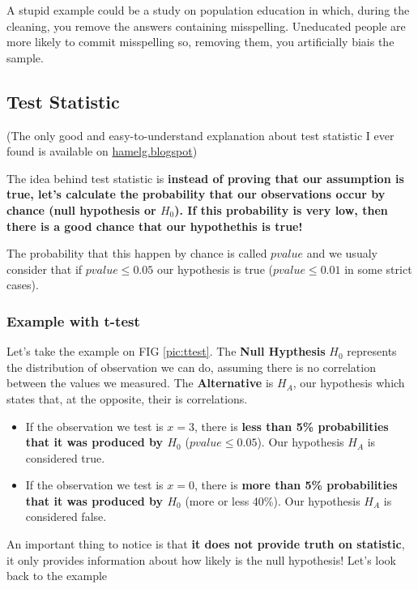 \documentclass[a4paper,11pt,twoside]{article}
\begin{document}
A stupid example could be a study on population education in which, during the cleaning, you remove the answers containing misspelling. Uneducated people are more likely to commit misspelling so, removing them, you artificially biais the sample.

\subsection{Test Statistic}

(The only good and easy-to-understand explanation about test statistic I ever found is available on \href{http://hamelg.blogspot.ch/2015/11/python-for-data-analysis-part-24.html?view=flipcard}{hamelg.blogspot})

The idea behind test statistic is \textbf{instead of proving that our assumption is true, let's calculate the probability that our observations occur by chance (null hypothesis or $H_0$). If this probability is very low, then there is a good chance that our hypothethis is true!}

The probability that this happen by chance is called $pvalue$ and we usualy consider that if $pvalue \leq 0.05$ our hypothesis is true ($pvalue \leq 0.01$ in some strict cases).

\subsubsection{Example with t-test}

Let's take the example on FIG \ref{pic:ttest}. The \textbf{Null Hypthesis} $H_0$ represents the distribution of observation we can do, assuming there is no correlation between the values we measured. The \textbf{Alternative} is $H_A$, our hypothesis which states that, at the opposite, their is correlations.
\begin{itemize}
	\item If the observation we test is $x=3$, there is \textbf{less than 5\% probabilities that it was produced by $H_0$} ($pvalue \leq 0.05$). Our hypothesis $H_A$ is considered true.

	\item If the observation we test is $x=0$, there is \textbf{more than 5\% probabilities that it was produced by $H_0$} (more or less 40\%). Our hypothesis $H_A$ is considered false.
\end{itemize}

{\color{red} An important thing to notice is that \textbf{it does not provide truth on statistic}, it only provides information about how likely is the null hypothesis! Let's look back to the example}
\end{document}
